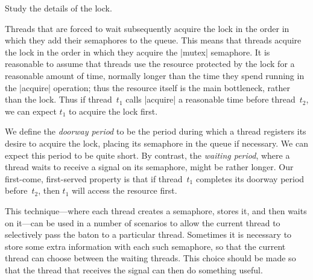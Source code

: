 
\begin{instruction}
Study the details of the lock.
\end{instruction}

Threads that are forced to wait subsequently acquire the lock in the order in
which they add their semaphores to the queue.  This means that threads acquire
the lock in the order in which they acquire the |mutex| semaphore.  It is
reasonable to assume that threads use the resource protected by the lock for a
reasonable amount of time, normally longer than the time they spend running in
the |acquire| operation; thus the resource itself is the main bottleneck,
rather than the lock.  Thus if thread~$t_1$ calls |acquire| a reasonable time
before thread~$t_2$, we can expect $t_1$ to acquire the lock first.

We define the \emph{doorway period} to be the period during which a thread
registers its desire to acquire the lock, placing its semaphore in the queue
if necessary.  We can expect this period to be quite short.  By contrast, the
\emph{waiting period}, where a thread waits to receive a signal on its
semaphore, might be rather longer.  Our first-come, first-served property is
that if thread~$t_1$ completes its doorway period before~$t_2$, then $t_1$
will access the resource first.


This technique---where each thread creates a semaphore, stores it, and then
waits on it---can be used in a number of scenarios to allow the current
thread to selectively pass the baton to a particular thread.
%
Sometimes it is necessary to store some extra information with each such
semaphore, so that the current thread can choose between the waiting threads.
This choice should be made so that the thread that receives the signal can
then do something useful. 

